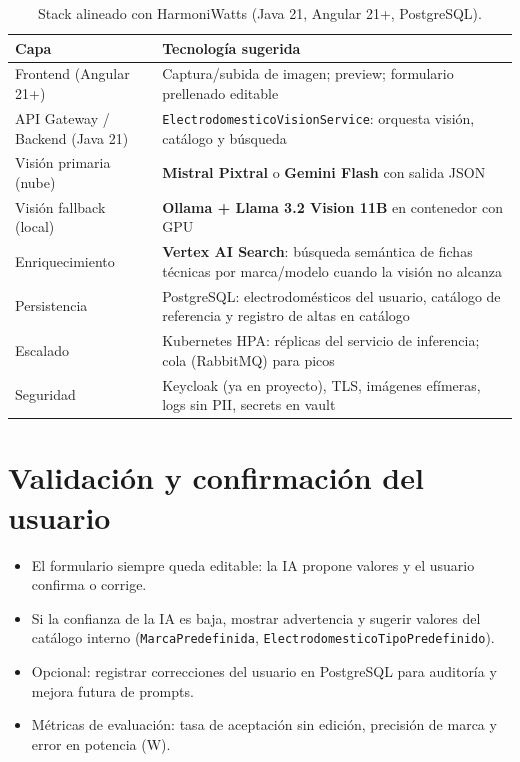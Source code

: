 \documentclass[11pt,a4paper]{article}
\renewcommand{\arraystretch}{1.25}
\begin{document}
\begin{table}[H]
\centering
\footnotesize
\renewcommand{\arraystretch}{1.2}
\caption{Stack alineado con HarmoniWatts (Java 21, Angular 21+, PostgreSQL).}
\begin{tabularx}{\textwidth}{|L{0.26\textwidth}|Y|}
\hline
{}
\textbf{Capa} & \textbf{Tecnología sugerida} \\ \hline
Frontend (Angular 21+) & Captura/subida de imagen; preview; formulario prellenado editable \\ \hline
API Gateway / Backend (Java 21) & \texttt{ElectrodomesticoVisionService}: orquesta visión, catálogo y búsqueda \\ \hline
Visión primaria (nube) & \textbf{Mistral Pixtral} o \textbf{Gemini Flash} con salida JSON \\ \hline
Visión fallback (local) & \textbf{Ollama + Llama 3.2 Vision 11B} en contenedor con GPU \\ \hline
Enriquecimiento & \textbf{Vertex AI Search}: búsqueda semántica de fichas técnicas por marca/modelo cuando la visión no alcanza \\ \hline
Persistencia & PostgreSQL: electrodomésticos del usuario, catálogo de referencia y registro de altas en catálogo \\ \hline
Escalado & Kubernetes HPA: réplicas del servicio de inferencia; cola (RabbitMQ) para picos \\ \hline
Seguridad & Keycloak (ya en proyecto), TLS, imágenes efímeras, logs sin PII, secrets en vault \\ \hline
\end{tabularx}
\end{table}

\section{Validación y confirmación del usuario}

\begin{itemize}[leftmargin=*]
  \item El formulario siempre queda editable: la IA propone valores y el usuario confirma o corrige.
  \item Si la confianza de la IA es baja, mostrar advertencia y sugerir valores del catálogo interno (\texttt{MarcaPredefinida}, \texttt{ElectrodomesticoTipoPredefinido}).
  \item Opcional: registrar correcciones del usuario en PostgreSQL para auditoría y mejora futura de prompts.
  \item Métricas de evaluación: tasa de aceptación sin edición, precisión de marca y error en potencia (W).
\end{itemize}
\end{document}
